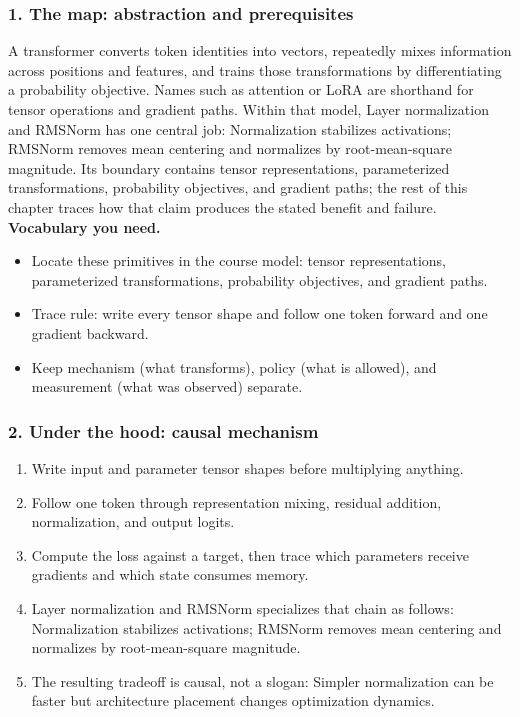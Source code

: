 \subsubsection*{1. The map: abstraction and prerequisites}
A transformer converts token identities into vectors, repeatedly mixes information across positions and features, and trains those transformations by differentiating a probability objective. Names such as attention or LoRA are shorthand for tensor operations and gradient paths.
Within that model, Layer normalization and RMSNorm has one central job: Normalization stabilizes activations; RMSNorm removes mean centering and normalizes by root-mean-square magnitude. Its boundary contains tensor representations, parameterized transformations, probability objectives, and gradient paths; the rest of this chapter traces how that claim produces the stated benefit and failure.
\textbf{Vocabulary you need.}\begin{itemize}
\item Locate these primitives in the course model: tensor representations, parameterized transformations, probability objectives, and gradient paths.
\item Trace rule: write every tensor shape and follow one token forward and one gradient backward.
\item Keep mechanism (what transforms), policy (what is allowed), and measurement (what was observed) separate.
\end{itemize}
\subsubsection*{2. Under the hood: causal mechanism}\begin{enumerate}
\item Write input and parameter tensor shapes before multiplying anything.
\item Follow one token through representation mixing, residual addition, normalization, and output logits.
\item Compute the loss against a target, then trace which parameters receive gradients and which state consumes memory.
\item Layer normalization and RMSNorm specializes that chain as follows: Normalization stabilizes activations; RMSNorm removes mean centering and normalizes by root-mean-square magnitude.
\item The resulting tradeoff is causal, not a slogan: Simpler normalization can be faster but architecture placement changes optimization dynamics.
\end{enumerate}
